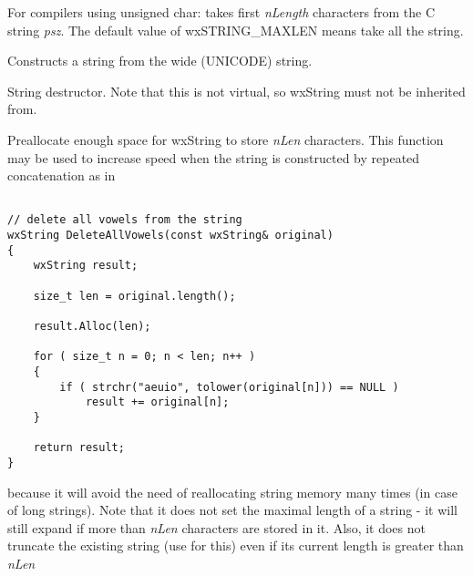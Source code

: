 {

For compilers using unsigned char: takes first {\it nLength} characters from the C string {\it psz}.
The default value of wxSTRING\_MAXLEN means take all the string.


Constructs a string from the wide (UNICODE) string.

\label{wxstringdestruct}


String destructor. Note that this is not virtual, so wxString must not be inherited from.

\label{wxstringalloc}


Preallocate enough space for wxString to store {\it nLen} characters. This function
may be used to increase speed when the string is constructed by repeated
concatenation as in

\begin{verbatim}

// delete all vowels from the string
wxString DeleteAllVowels(const wxString& original)
{
    wxString result;

    size_t len = original.length();

    result.Alloc(len);

    for ( size_t n = 0; n < len; n++ )
    {
        if ( strchr("aeuio", tolower(original[n])) == NULL )
            result += original[n];
    }

    return result;
}

\end{verbatim}

because it will avoid the need of reallocating string memory many times (in case
of long strings). Note that it does not set the maximal length of a string - it
will still expand if more than {\it nLen} characters are stored in it. Also, it
does not truncate the existing string (use 
 for this) even if its current length is
greater than {\it nLen}

\label{wxstringappend}


}
